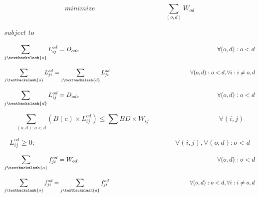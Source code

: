 \vspace{20pt}

\begin{equation}
minimize \qquad \qquad \qquad \qquad \qquad  \sum_{(o,d)} W_{od}
\label{ILPTransluc}
\end{equation}

$subject$ $to$

\begin{equation}
\sum_{j \textbackslash \{o\} } L_{ij}^{od} = D_{odc}
\qquad \qquad \qquad \qquad \qquad \qquad \qquad \qquad \qquad \qquad \qquad
\forall (o,d):o<d
\label{ILPTransluc1}
\end{equation}

\begin{equation}
\sum_{j \textbackslash \{o\} } L_{ji}^{od} = \sum_{j \textbackslash \{d\} } L_{ji}^{od}
\qquad \qquad \qquad \qquad \qquad \qquad \qquad
\forall (o,d):o<d , \forall i : i \neq o,d
\label{ILPTransluc2}
\end{equation}

\begin{equation}
\sum_{j \textbackslash \{d\} } L_{ij}^{od} = D_{odc}
\qquad \qquad \qquad \qquad \qquad \qquad \qquad \qquad \qquad \qquad \qquad
\forall (o,d):o<d
\label{ILPTransluc3}
\end{equation}

\begin{equation}
\sum_{(o,d):o<d} \left( B(c) \times L_{ij}^{od}\right) \leq  \sum BD \times W_{ij}
\qquad \qquad \qquad \qquad \qquad
\forall (i,j)
\label{ILPTransluc4}
\end{equation}

\begin{equation}
L_{ij}^{od} \geq 0;
\qquad \qquad \qquad \qquad \qquad \qquad \qquad \qquad \qquad \qquad
\forall (i,j) , \forall (o,d) : o < d
\label{ILPTransluc5}
\end{equation}

\begin{equation}
\sum_{j \textbackslash \{o\} } f_{ji}^{od} = W_{od}
\qquad \qquad \qquad \qquad \qquad \qquad \qquad \qquad \qquad \qquad \qquad
\forall (o,d):o<d
\label{ILPTransluc6}
\end{equation}

\begin{equation}
\sum_{j \textbackslash \{o\} } f_{ji}^{od} = \sum_{j \textbackslash \{d\} } f_{ji}^{od}
\qquad \qquad \qquad \qquad \qquad \qquad \qquad
\forall (o,d):o<d , \forall i : i \neq o,d
\label{ILPTransluc7}
\end{equation}

